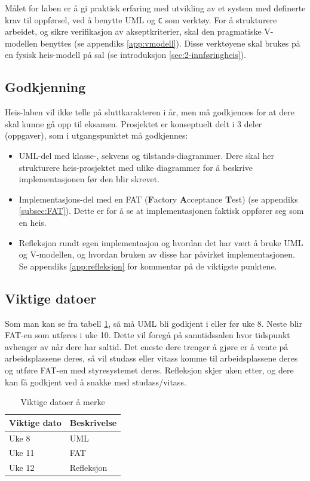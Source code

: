 \begin{alphasection}
Målet for laben er å gi praktisk erfaring med utvikling av et system med definerte krav til oppførsel, ved å benytte UML og \verb|C| som verktøy. For å strukturere arbeidet, og sikre verifikasjon av akseptkriterier, skal den pragmatiske V-modellen benyttes (se appendiks \ref{app:vmodell}). Disse verktøyene skal brukes på en fysisk heis-modell på sal (se introduksjon \ref{sec:2-innføringheis}). 

\subsection*{Godkjenning}

Heis-laben vil ikke telle på sluttkarakteren i år, men må godkjennes for at dere skal kunne gå opp til eksamen. Prosjektet er konseptuelt delt i 3 deler (oppgaver), som i utgangspunktet må godkjennes:
\begin{itemize}
    \item UML-del med klasse-, sekvens og tilstands-diagrammer. Dere skal her strukturere heis-prosjektet med ulike diagrammer for å beskrive implementasjonen før den blir skrevet.
    \item Implementasjons-del med en FAT (\textbf{F}actory \textbf{A}cceptance \textbf{T}est) (se appendiks \ref{subsec:FAT}). Dette er for å se at implementasjonen faktisk oppfører seg som en heis.
    \item Refleksjon rundt egen implementasjon og hvordan det har vært å bruke UML og V-modellen, og hvordan bruken av disse har påvirket implementasjonen. Se appendiks \ref{app:refleksjon} for kommentar på de viktigste punktene.
\end{itemize}

\subsection*{Viktige datoer}



Som man kan se fra tabell \ref{tab:viktige-dato}, så må UML bli godkjent i eller før uke 8. Neste blir FAT-en som utføres i uke 10. Dette vil foregå på sanntidssalen hvor tidspunkt avhenger av når dere har saltid. Det eneste dere trenger å gjøre er å vente på arbeidsplassene deres, så vil studass eller vitass komme til arbeidsplassene deres og utføre FAT-en med styresystemet deres. Refleksjon skjer uken etter, og dere kan få godkjent ved å snakke med studass/vitass.

\begin{table}[ht]
\centering
 \begin{tabular}{|p{4cm} p{5.5cm}|} 
 \hline
 Viktige dato & Beskrivelse \\ [0.5ex] 
 \hline\hline
 Uke 8 & UML \\
 \hline
  Uke 11 & FAT \\
 \hline
 Uke 12 & Refleksjon \\
 \hline
\end{tabular}
\caption{Viktige datoer å merke}
\label{tab:viktige-dato} 
\end{table}


\end{alphasection}
